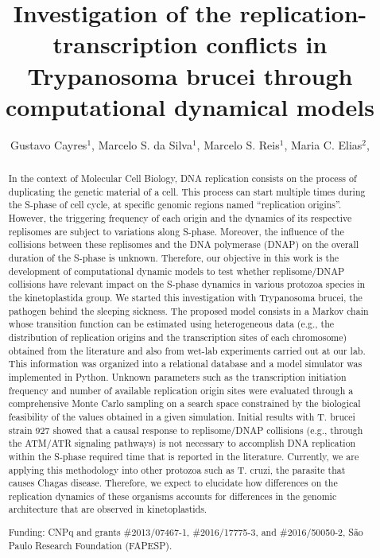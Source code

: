 \documentclass[twoside]{article}
\title{\vspace{-15mm}\fontsize{24pt}{10pt}\selectfont\textbf{ Investigation of the replication-transcription conflicts in Trypanosoma brucei  through computational dynamical models }} %
\author{ Gustavo Cayres$^{1}$, Marcelo S. da Silva$^{1}$, Marcelo S. Reis$^{1}$, Maria C. Elias$^{2}$, }
\affil{ 1 Instituto Butantan

2 LECC-CeTICS, Butantan Institute

 }
\date{}
\begin{document}
  
  
  \maketitle %
  
  
  \thispagestyle{fancy} %
  
  
  \begin{abstract}
  In the context of Molecular Cell Biology, DNA replication consists on the process of duplicating the genetic material of a cell. This process can start multiple times during the S-phase of cell cycle, at specific genomic regions named “replication origins”. However, the triggering frequency of each origin and the dynamics of its respective replisomes are subject to variations along S-phase. Moreover, the influence of the collisions between these replisomes and the DNA polymerase (DNAP) on the overall duration of the S-phase is unknown.
Therefore, our objective in this work is the development of computational dynamic models to test whether replisome/DNAP collisions have relevant impact on the S-phase dynamics in various protozoa species in the kinetoplastida group. We started this investigation with Trypanosoma brucei, the pathogen behind the sleeping sickness.
The proposed model consists in a Markov chain whose transition function can be estimated using heterogeneous data (e.g., the distribution of replication origins and the transcription sites of each chromosome) obtained from the literature and also from wet-lab experiments carried out at our lab. This information was organized into a relational database and a model simulator was implemented in Python. Unknown parameters such as the transcription initiation frequency and number of
available replication origin sites were evaluated through a comprehensive Monte Carlo sampling on a search space constrained by the biological feasibility of the values obtained in a given simulation.
Initial results with T. brucei strain 927 showed that a causal response to replisome/DNAP collisions (e.g., through the ATM/ATR signaling pathways) is not necessary to accomplish DNA replication within the S-phase required time that is reported in the literature. Currently, we are applying this methodology into other protozoa such as T. cruzi, the parasite that causes Chagas disease. Therefore, we expect to elucidate how differences on the replication dynamics of these organisms accounts for differences in the genomic architecture that are observed in kinetoplastids.
  
  Funding: CNPq and grants \#2013/07467-1, \#2016/17775-3, and \#2016/50050-2, S\~ao Paulo Research Foundation (FAPESP). \\ 
  \end{abstract}
  
\end{document}
